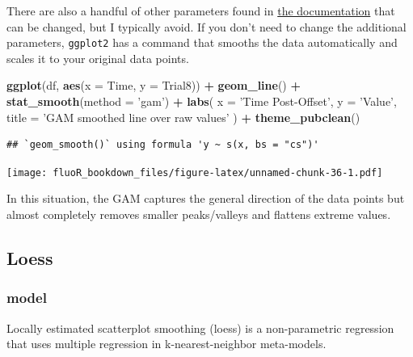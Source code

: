\documentclass[
]{book}
\newenvironment{Shaded}{\begin{snugshade}}{\end{snugshade}}
\newcommand{\DataTypeTok}[1]{\textcolor[rgb]{0.13,0.29,0.53}{#1}}
\newcommand{\KeywordTok}[1]{\textcolor[rgb]{0.13,0.29,0.53}{\textbf{#1}}}
\newcommand{\NormalTok}[1]{#1}
\newcommand{\OperatorTok}[1]{\textcolor[rgb]{0.81,0.36,0.00}{\textbf{#1}}}
\newcommand{\StringTok}[1]{\textcolor[rgb]{0.31,0.60,0.02}{#1}}
\begin{document}
There are also a handful of other parameters found in \href{https://www.rdocumentation.org/packages/mgcv/versions/1.8-33/topics/gam}{the documentation} that can be changed, but I typically avoid. If you don't need to change the additional parameters, \texttt{ggplot2} has a command that smooths the data automatically and scales it to your original data points.

\begin{Shaded}
\begin{Highlighting}[]
\KeywordTok{ggplot}\NormalTok{(df, }\KeywordTok{aes}\NormalTok{(}\DataTypeTok{x =}\NormalTok{ Time, }\DataTypeTok{y =}\NormalTok{ Trial8)) }\OperatorTok{+}
\StringTok{  }\KeywordTok{geom_line}\NormalTok{() }\OperatorTok{+}
\StringTok{  }\KeywordTok{stat_smooth}\NormalTok{(}\DataTypeTok{method =} \StringTok{'gam'}\NormalTok{) }\OperatorTok{+}
\StringTok{  }\KeywordTok{labs}\NormalTok{(}
    \DataTypeTok{x =} \StringTok{'Time Post-Offset'}\NormalTok{,}
    \DataTypeTok{y =} \StringTok{'Value'}\NormalTok{,}
    \DataTypeTok{title =} \StringTok{'GAM smoothed line over raw values'}
\NormalTok{    ) }\OperatorTok{+}
\StringTok{  }\KeywordTok{theme_pubclean}\NormalTok{()}
\end{Highlighting}
\end{Shaded}

\begin{verbatim}
## `geom_smooth()` using formula 'y ~ s(x, bs = "cs")'
\end{verbatim}

\texttt{[image: fluoR\_bookdown\_files/figure-latex/unnamed-chunk-36-1.pdf]}

In this situation, the GAM captures the general direction of the data points but almost completely removes smaller peaks/valleys and flattens extreme values.

\hypertarget{vis-smoothing-loess}{%
\subsection{Loess}\label{vis-smoothing-loess}}

\hypertarget{vis-smoothing-loess-model}{%
\subsubsection{model}\label{vis-smoothing-loess-model}}

Locally estimated scatterplot smoothing (loess) is a non-parametric regression that uses multiple regression in k-nearest-neighbor meta-models.
\end{document}

